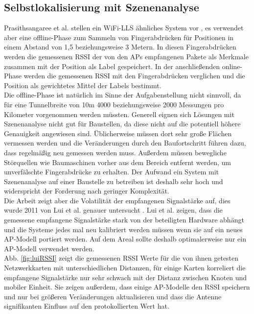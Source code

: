 \subsection{Selbstlokalisierung mit Szenenanalyse}
\label{ch:Vorherige:sec:RSS-basierte}
Prasithsangaree et al. stellen ein WiFi-LLS ähnliches System vor \cite{prasithsangaree2002indoor}, es verwendet aber eine offline-Phase zum Sammeln von Fingerabdrücken für Positionen in einem Abstand von 1,5 beziehungsweise 3 Metern. 
In diesen Fingerabdrücken werden die gemessenen RSSI der von den APs empfangenen Pakete als Merkmale zusammen mit der Position als Label gespeichert.
In der anschließenden online-Phase werden die gemessenen RSSI mit den Fingerabdrücken verglichen und die Position als gewichtetes Mittel der Labels bestimmt. \\
Die offline-Phase ist natürlich im Sinne der Aufgabenstellung nicht sinnvoll, da für eine Tunnelbreite von 10m 4000 beziehungsweise 2000 Messungen pro Kilometer vorgenommen werden müssten.
Generell eignen sich Lösungen mit Szenenanalyse nicht gut für Baustellen, da diese nicht auf die potentiell höhere Genauigkeit angewiesen sind. 
Üblicherweise müssen dort sehr große Flächen vermessen werden und die Veränderungen durch den Baufortschritt führen dazu, dass regelmäßig neu gemessen werden muss.
Außerdem müssen bewegliche Störquellen wie Baumaschinen vorher aus dem Bereich entfernt werden, um unverfälschte Fingerabdrücke zu erhalten.
Der Aufwand ein System mit Szenenanalyse auf einer Baustelle zu betreiben ist deshalb sehr hoch und widerspricht der Forderung nach geringer Komplexität. \\
Die Arbeit zeigt aber die Volatilität der empfangenen Signalstärke auf, dies wurde 2011 von Lui et al. genauer untersucht \cite{lui2011differences}.
Lui et al. zeigen, dass die gemessene empfangene Signalstärke stark von der beteiligten Hardware abhängt und die Systeme jedes mal neu kalibriert werden müssen wenn sie auf ein neues AP-Modell portiert werden. 
Auf dem Areal sollte deshalb optimalerweise nur ein AP-Modell verwendet werden. \\
Abb. \ref{fig:luiRSSI} zeigt die gemessenen RSSI Werte für die von ihnen getesten Netzwerkkarten mit unterschiedlichen Distanzen, für einige Karten korreliert die empfangene Signalstärke nur sehr schwach mit der Distanz zwischen Knoten und mobiler Einheit.
Sie zeigen außerdem, dass einige AP-Modelle den RSSI speichern und nur bei größeren Veränderungen aktualisieren und dass die Antenne signifikanten Einfluss auf den protokollierten Wert hat.



